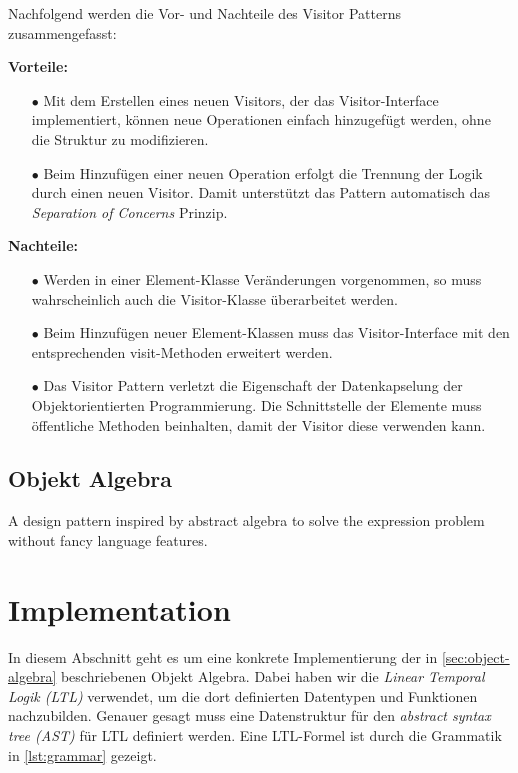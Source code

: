 \documentclass{llncs}
\begin{document}
Nachfolgend werden die Vor- und Nachteile des Visitor Patterns zusammengefasst: \linebreak

\textbf{Vorteile:}
\begin{itemize}
	\item[$\bullet$] Mit dem Erstellen eines neuen Visitors, der das Visitor-Interface implementiert, können neue Operationen einfach hinzugefügt werden, ohne die Struktur zu modifizieren.
	\item[$\bullet$] Beim Hinzufügen einer neuen Operation erfolgt die Trennung der Logik durch einen neuen Visitor. Damit unterstützt das Pattern automatisch das \textit{Separation of Concerns} Prinzip.
\end{itemize}

\textbf{Nachteile:}
\begin{itemize}
	\item[$\bullet$] Werden in einer Element-Klasse Veränderungen vorgenommen, so muss wahrscheinlich auch die Visitor-Klasse überarbeitet werden.
	\item[$\bullet$] Beim Hinzufügen neuer Element-Klassen muss das Visitor-Interface mit den entsprechenden visit-Methoden erweitert werden.
	\item[$\bullet$] Das Visitor Pattern verletzt die Eigenschaft der Datenkapselung der Objektorientierten Programmierung. Die Schnittstelle der Elemente muss öffentliche Methoden beinhalten, damit der Visitor diese verwenden kann.
\end{itemize}

\subsection{Objekt Algebra} \label{sec:object-algebra}
A design pattern inspired by abstract algebra to solve the expression problem without fancy language features. 

\section{Implementation} \label{sec:implementation}
In diesem Abschnitt geht es um eine konkrete Implementierung der in \autoref{sec:object-algebra} beschriebenen Objekt Algebra.
Dabei haben wir die \emph{Linear Temporal Logik (LTL)} \cite{pnueli77} verwendet, um die dort definierten Datentypen und Funktionen nachzubilden.
Genauer gesagt muss eine Datenstruktur für den \emph{abstract syntax tree (AST)} für LTL definiert werden.
Eine LTL-Formel ist durch die Grammatik in \autoref{lst:grammar} gezeigt.
\end{document}
